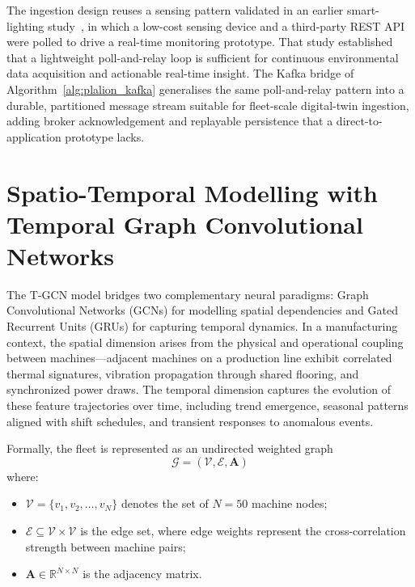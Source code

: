 The ingestion design reuses a sensing pattern validated in an earlier smart-lighting study~\cite{widartha_smart_lighting_2024}, in which a low-cost sensing device and a third-party REST API were polled to drive a real-time monitoring prototype. That study established that a lightweight poll-and-relay loop is sufficient for continuous environmental data acquisition and actionable real-time insight. The Kafka bridge of Algorithm~\ref{alg:plalion_kafka} generalises the same poll-and-relay pattern into a durable, partitioned message stream suitable for fleet-scale digital-twin ingestion, adding broker acknowledgement and replayable persistence that a direct-to-application prototype lacks.

\section{Spatio-Temporal Modelling with Temporal Graph Convolutional Networks}
The T-GCN model bridges two complementary neural paradigms: Graph Convolutional Networks (GCNs) for modelling spatial dependencies and Gated Recurrent Units (GRUs) for capturing temporal dynamics. In a manufacturing context, the spatial dimension arises from the physical and operational coupling between machines—adjacent machines on a production line exhibit correlated thermal signatures, vibration propagation through shared flooring, and synchronized power draws. The temporal dimension captures the evolution of these feature trajectories over time, including trend emergence, seasonal patterns aligned with shift schedules, and transient responses to anomalous events.

Formally, the fleet is represented as an undirected weighted graph
\begin{equation}
\mathcal{G} = (\mathcal{V}, \mathcal{E}, \mathbf{A})
\end{equation}
where:
\begin{itemize}
    \item $\mathcal{V} = \{v_1, v_2, \ldots, v_N\}$ denotes the set of $N = 50$ machine nodes;
    \item $\mathcal{E} \subseteq \mathcal{V} \times \mathcal{V}$ is the edge set, where edge weights represent the cross-correlation strength between machine pairs;
    \item $\mathbf{A} \in \mathbb{R}^{N \times N}$ is the adjacency matrix.
\end{itemize}

